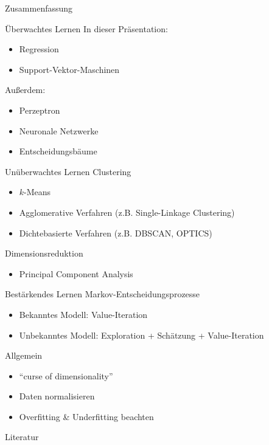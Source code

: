 \documentclass[xcolor={dvipsnames,svgnames}]{beamer}
\begin{document}
\begin{frame}[allowframebreaks]{Zusammenfassung}

  \begin{block}{Überwachtes Lernen}
  In dieser Präsentation:
  \begin{itemize}
  \item Regression
  \item Support-Vektor-Maschinen
  \end{itemize}
  Außerdem:
  \begin{itemize}
  \item Perzeptron
  \item Neuronale Netzwerke
  \item Entscheidungsbäume
  \end{itemize}
  \end{block}
  \framebreak
  \begin{block}{Unüberwachtes Lernen}
    Clustering
    \begin{itemize}
    \item $k$-Means
    \item Agglomerative Verfahren (z.B. Single-Linkage Clustering)
    \item Dichtebasierte Verfahren (z.B. DBSCAN, OPTICS)
    \end{itemize}
    Dimensionsreduktion
    \begin{itemize}
    \item Principal Component Analysis
    \end{itemize}
  \end{block}
  \framebreak
  \begin{block}{Bestärkendes Lernen}
    Markov-Entscheidungsprozesse
    \begin{itemize}
    \item Bekanntes Modell: Value-Iteration
    \item Unbekanntes Modell: Exploration + Schätzung + Value-Iteration
    \end{itemize}
  \end{block}
  \begin{block}{Allgemein}
    \begin{itemize}
    \item "`curse of dimensionality"'
    \item Daten normalisieren
    \item Overfitting \& Underfitting beachten
    \end{itemize}
  \end{block}

\end{frame}

\begin{frame}[shrink=10]{Literatur}
  \nocite{Bishop2006,CourseeraAndrewNg,Russell02artificialintelligence}
  \printbibliography[heading=none]
\end{frame}
\end{document}
